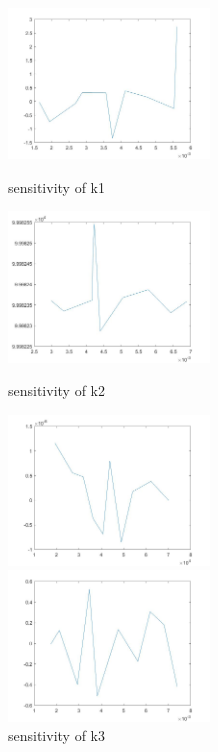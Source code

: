 \begin{figure}
	\centering
	\begin{varwidth}[t]{\textwidth}
		\vspace{0pt}
		\includegraphics[height=4cm]{s1.jpg}
	\end{varwidth}%
	\caption{sensitivity of k1}
	\begin{varwidth}[t]{\textwidth}
		\vspace{0pt}
		\includegraphics[height=4cm]{s2.jpg}
	\end{varwidth}
	\caption{sensitivity of k2}
	\begin{varwidth}[t]{\textwidth}
		\vspace{0pt}
		\includegraphics[height=4cm]{s3.jpg}
	\end{varwidth}
	\caption{sensitivity of k3}
	\begin{varwidth}[t]{\textwidth}
		\vspace{0pt}
		\includegraphics[height=4cm]{s4.jpg}

\end{varwidth}
\end{figure}
